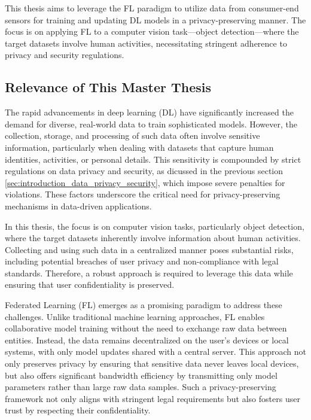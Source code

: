 \documentclass[thesis]{mas_proposal}
\begin{document}
This thesis aims to leverage the FL paradigm to utilize data from consumer-end sensors for training and updating DL models in a privacy-preserving manner. The focus is on applying FL to a computer vision task—object detection—where the target datasets involve human activities, necessitating stringent adherence to privacy and security regulations.

\subsection{Relevance of This Master Thesis}

\indent \indent The rapid advancements in deep learning (DL) have significantly increased the demand for diverse, real-world data to train sophisticated models. However, the collection, storage, and processing of such data often involve sensitive information, particularly when dealing with datasets that capture human identities, activities, or personal details. This sensitivity is compounded by strict regulations on data privacy and security, as dicussed in the previous section \ref{sec:introduction_data_privacy_security}, which impose severe penalties for violations. These factors underscore the critical need for privacy-preserving mechanisms in data-driven applications.
        
In this thesis, the focus is on computer vision tasks, particularly object detection, where the target datasets inherently involve information about human activities. Collecting and using such data in a centralized manner poses substantial risks, including potential breaches of user privacy and non-compliance with legal standards. Therefore, a robust approach is required to leverage this data while ensuring that user confidentiality is preserved.
    
Federated Learning (FL) emerges as a promising paradigm to address these challenges. Unlike traditional machine learning approaches, FL enables collaborative model training without the need to exchange raw data between entities. Instead, the data remains decentralized on the user’s devices or local systems, with only model updates shared with a central server. This approach not only preserves privacy by ensuring that sensitive data never leaves local devices, but also offers significant bandwidth efficiency by transmitting only model parameters rather than large raw data samples. Such a privacy-preserving framework not only aligns with stringent legal requirements but also fosters user trust by respecting their confidentiality.
    
\end{document}
